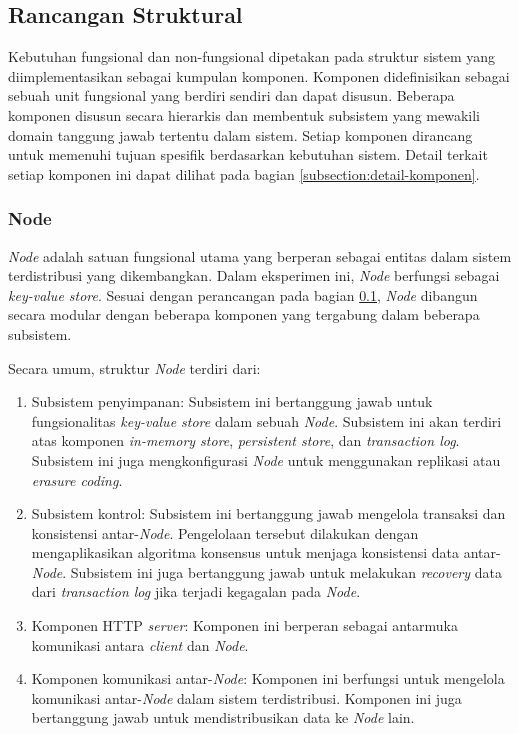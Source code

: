 \subsection{Rancangan Struktural}
\label{subsection:rancangan-struktural}

Kebutuhan fungsional dan non-fungsional dipetakan pada struktur sistem yang diimplementasikan sebagai kumpulan komponen. Komponen didefinisikan sebagai sebuah unit fungsional yang berdiri sendiri dan dapat disusun. Beberapa komponen disusun secara hierarkis dan membentuk subsistem yang mewakili domain tanggung jawab tertentu dalam sistem. Setiap komponen dirancang untuk memenuhi tujuan spesifik berdasarkan kebutuhan sistem. Detail terkait setiap komponen ini dapat dilihat pada bagian \ref{subsection:detail-komponen}.

\subsubsection{Node}
\label{subsubsection:node}

\textit{Node} adalah satuan fungsional utama yang berperan sebagai entitas dalam sistem terdistribusi yang dikembangkan. Dalam eksperimen ini, \textit{Node} berfungsi sebagai \textit{key-value store}. Sesuai dengan perancangan pada bagian \ref{subsection:rancangan-struktural}, \textit{Node} dibangun secara modular dengan beberapa komponen yang tergabung dalam beberapa subsistem.

Secara umum, struktur \textit{Node} terdiri dari:

\begin{enumerate}
    \item Subsistem penyimpanan: Subsistem ini bertanggung jawab untuk fungsionalitas \textit{key-value store} dalam sebuah \textit{Node}. Subsistem ini akan terdiri atas komponen \textit{in-memory store}, \textit{persistent store}, dan \textit{transaction log}. Subsistem ini juga mengkonfigurasi \textit{Node} untuk menggunakan replikasi atau \textit{erasure coding}.
    \item Subsistem kontrol: Subsistem ini bertanggung jawab mengelola transaksi dan konsistensi antar-\textit{Node}. Pengelolaan tersebut dilakukan dengan mengaplikasikan algoritma konsensus untuk menjaga konsistensi data antar-\textit{Node}. Subsistem ini juga bertanggung jawab untuk melakukan \textit{recovery} data dari \textit{transaction log} jika terjadi kegagalan pada \textit{Node}.
    \item Komponen HTTP \textit{server}: Komponen ini berperan sebagai antarmuka komunikasi antara \textit{client} dan \textit{Node}.
    \item Komponen komunikasi antar-\textit{Node}: Komponen ini berfungsi untuk mengelola komunikasi antar-\textit{Node} dalam sistem terdistribusi. Komponen ini juga bertanggung jawab untuk mendistribusikan data ke \textit{Node} lain.
\end{enumerate}

